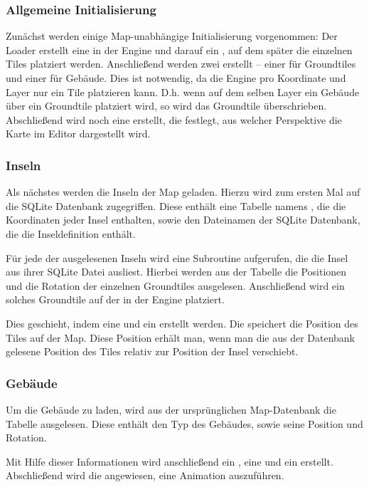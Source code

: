 \subsubsection{Allgemeine Initialisierung}
Zunächst werden einige Map-unabhängige Initialisierung vorgenommen:
Der Loader erstellt eine  in der Engine und darauf ein
, auf dem später die einzelnen Tiles platziert werden.
Anschließend werden zwei  erstellt -- einer für Groundtiles
und einer für Gebäude. Dies ist notwendig, da die Engine pro Koordinate
und Layer nur ein Tile platzieren kann. D.h. wenn auf dem selben Layer
ein Gebäude über ein Groundtile platziert wird, so wird das Groundtile
überschrieben.
Abschließend wird noch eine  erstellt, die festlegt, aus
welcher Perspektive die Karte im Editor dargestellt wird.

\subsubsection{Inseln}
Als nächstes werden die Inseln der Map geladen. Hierzu wird zum ersten
Mal auf die SQLite Datenbank zugegriffen. Diese enthält eine Tabelle
namens , die die Koordinaten jeder Insel enthalten, sowie
den Dateinamen der SQLite Datenbank, die die Inseldefinition enthält.

Für jede der ausgelesenen Inseln wird eine Subroutine aufgerufen, die
die Insel aus ihrer SQLite Datei ausliest. Hierbei werden aus der
 Tabelle die Positionen und die Rotation der einzelnen
Groundtiles ausgelesen. Anschließend wird ein solches Groundtile
auf der  in der Engine platziert.

Dies geschieht, indem eine  und ein 
erstellt werden. Die  speichert die Position des Tiles
auf der Map. Diese Position erhält man, wenn man die aus der Datenbank
gelesene Position des Tiles relativ zur Position der Insel verschiebt.

\subsubsection{Gebäude}
Um die Gebäude zu laden, wird aus der ursprünglichen Map-Datenbank
die Tabelle  ausgelesen. Diese enthält den Typ des Gebäudes,
sowie seine Position und Rotation.

Mit Hilfe dieser Informationen wird anschließend ein , eine
 und ein  erstellt. Abschließend
wird die  angewiesen, eine Animation auszuführen.

